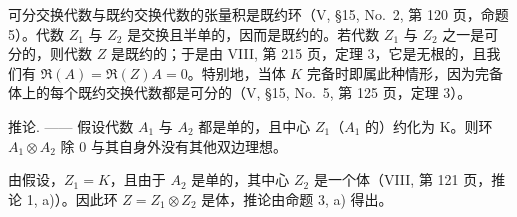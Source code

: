 可分交换代数与既约交换代数的张量积是既约环（V, §15, No.~2, 第 120 页，命题 5）。代数 \(Z_1\) 与 \(Z_2\) 是交换且半单的，因而是既约的。若代数 \(Z_1\) 与 \(Z_2\) 之一是可分的，则代数 \(Z\) 是既约的；于是由 VIII, 第 215 页，定理 3，它是无根的，且我们有 \(\Re(A) = \Re(Z)A = 0\)。特别地，当体 \(K\) 完备时即属此种情形，因为完备体上的每个既约交换代数都是可分的（V, §15, No.~5, 第 125 页，定理 3）。

推论. —— 假设代数 \(A_{1}\) 与 \(A_{2}\) 都是单的，且中心 \(Z_{1}\)（\(A_{1}\) 的）约化为 K。则环 \(A_{1} \otimes A_{2}\) 除 0 与其自身外没有其他双边理想。

由假设，\(Z_{1} = K\)，且由于 \(A_{2}\) 是单的，其中心 \(Z_{2}\) 是一个体（VIII, 第 121 页，推论 1, a)）。因此环 \(Z = Z_{1} \otimes Z_{2}\) 是体，推论由命题 3, a) 得出。

